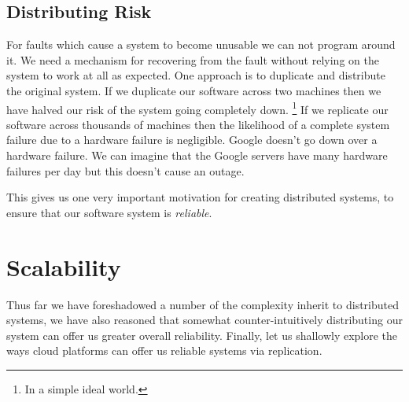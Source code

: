 \subsection{Distributing Risk}
For faults which cause a system to become unusable we can not program around it.
We need a mechanism for recovering from the fault without relying on the system to work at all as expected.
One approach is to duplicate and distribute the original system.
If we duplicate our software across two machines then we have halved our risk of the system going completely down.%
\footnote{In a simple ideal world.}
If we replicate our software across thousands of machines then the likelihood of a complete system failure due to a hardware failure is negligible.
Google doesn't go down over a hardware failure.
We can imagine that the Google servers have many hardware failures per day but this doesn't cause an outage.

This gives us one very important motivation for creating distributed systems,
to ensure that our software system is \textsl{reliable}.




\section{Scalability}
Thus far we have foreshadowed a number of the complexity inherit to distributed systems,
we have also reasoned that somewhat counter-intuitively distributing our system can offer us greater overall reliability.
Finally, let us shallowly explore the ways cloud platforms can offer us reliable systems via replication.

